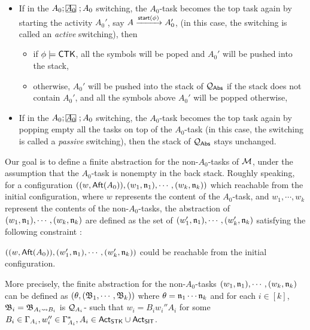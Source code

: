 {\begin{itemize}
    \item If in the $A_0; \mhcancel{A_0}; A_0$ switching, the $A_0$-task becomes the top task again by starting the activity $A_0'$, say $A\xrightarrow{{\mathsf{start} }(\phi)}A_0'$, (in this case, the switching is called an \emph{active} switching), then
    \begin{itemize}
        \item if $\phi \models {\sf CTK}$, all the symbols will be poped and $A_0'$ will be pushed into the stack,
        \item otherwise, $A_0'$ will be pushed into the stack of  ${\mathcal{Q} }_{{\mathsf{Abs} }}$ if the stack does not contain $A_0'$, and all the symbols above $A_0'$ will be popped otherwise,
    \end{itemize}
%
    \item If in the $A_0; \mhcancel{A_0}; A_0$ switching, the $A_0$-task becomes the top task again by popping empty all the tasks on top of the $A_0$-task (in this case, the switching is called a \emph{passive} switching), then the stack of ${\mathcal{Q} }_{{\mathsf{Abs} }}$ stays unchanged.
        
\end{itemize}

Our goal is to define a finite abstraction for the non-$A_0$-tasks of ${\mathcal{M} }$, under the assumption that the $A_0$-task is nonempty in the back stack. 
Roughly speaking, for a configuration $((w,{\sf Aft}(A_0)),(w_1,\mathfrak{n}_1),\cdots,(w_k,\mathfrak{n}_k))$ which reachable from the initial configuration, where $w$ represents the content of the $A_0$-task, and $w_1,\cdots,w_k$ represent the contents of the non-$A_0$-tasks, the abstraction of $(w_1,\mathfrak{n}_1),\cdots,(w_k,\mathfrak{n}_k)$ are defined as the set of $(w_1',\mathfrak{n}_1),\cdots,(w_k',\mathfrak{n}_k)$ satisfying the following constraint :
\begin{center}
$((w,{\sf Aft}(A_0)),(w_1',\mathfrak{n}_1),\cdots,(w_k',\mathfrak{n}_k))$ could be reachable from the initial configuration.
\end{center}
More precisely, the finite abstraction for the non-$A_0$-tasks $(w_1,\mathfrak{n}_1),\cdots,(w_k,\mathfrak{n}_k)$ can be defined as $(\theta,({\mathfrak{B} }_1,\cdots,{\mathfrak{B} }_k))$ where $\theta = \mathfrak{n}_1\cdots\mathfrak{n}_k$ and for each $i\in[k]$, ${\mathfrak{B} }_i = {\mathfrak{B} }_{A_i\rightsquigarrow B_i}$ is ${\mathcal{Q} }_{A_i}$-{\WOTrNFA} such that $w_i = B_iw_i''A_i$ for some $B_i\in\Gamma_{A_i}, w_i''\in\Gamma_{A_i}^*, A_i\in{\sf Act}_{\mathsf{STK}}\cup{\sf Act}_{\mathsf{SIT}}$.

}
